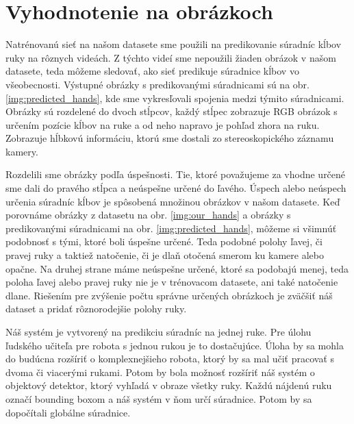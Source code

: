 \section{Vyhodnotenie na obrázkoch}
Natrénovanú sieť na našom datasete sme použili na predikovanie súradníc kĺbov ruky na rôznych videách. Z týchto videí sme nepoužili žiaden obrázok v našom datasete, teda môžeme sledovať, ako sieť predikuje súradnice kĺbov vo všeobecnosti. Výstupné obrázky s predikovanými súradnicami sú na obr. \ref{img:predicted_hands}, kde sme vykresľovali spojenia medzi týmito súradnicami. Obrázky sú rozdelené do dvoch stĺpcov, každý stĺpec zobrazuje RGB obrázok s určením pozície kĺbov na ruke a od neho napravo je pohľad zhora na ruku. Zobrazuje hĺbkovú informáciu, ktorú sme dostali zo stereoskopického záznamu kamery.

Rozdelili sme obrázky podľa úspešnosti. Tie, ktoré považujeme za vhodne určené sme dali do pravého stĺpca a neúspešne určené do ľavého. Úspech alebo neúspech určenia súradníc kĺbov je spôsobená množinou obrázkov v našom datasete. Keď porovnáme obrázky z datasetu na obr. \ref{img:our_hands} a obrázky s predikovanými súradnicami na obr. \ref{img:predicted_hands}, môžeme si všimnúť podobnosť s tými, ktoré boli úspešne určené. Teda podobné polohy ľavej, či pravej ruky a taktiež natočenie, či je dlaň otočená smerom ku kamere alebo opačne. Na druhej strane máme neúspešne určené, ktoré sa podobajú menej, teda poloha ľavej alebo pravej ruky nie je v trénovacom datasete, ani také natočenie dlane. Riešením pre zvýšenie počtu správne určených obrázkoch je zväčšiť náš dataset a pridať rôznorodejšie polohy ruky.

Náš systém je vytvorený na predikciu súradníc na jednej ruke. Pre úlohu ľudského učiteľa pre robota s jednou rukou je to dostačujúce. Úloha by sa mohla do budúcna rozšíriť o komplexnejšieho robota, ktorý by sa mal učiť pracovať s dvoma či viacerými rukami. Potom by bola možnosť rozšíriť náš systém o objektový detektor, ktorý vyhľadá v obraze všetky ruky. Každú nájdenú ruku označí bounding boxom a náš systém v ňom určí súradnice. Potom by sa dopočítali globálne súradnice.

